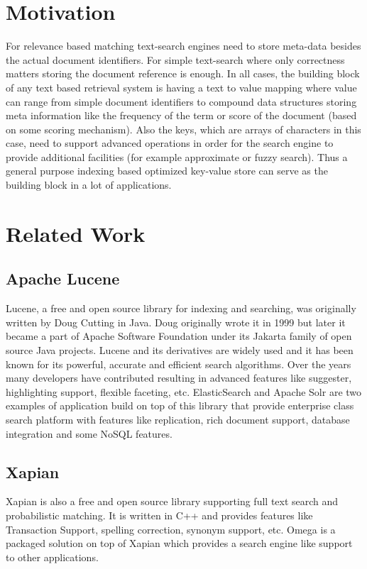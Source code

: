 \section{Motivation}
For relevance based matching text-search engines need to store meta-data besides the actual document identifiers.
For simple text-search where only correctness matters storing the document reference is enough.
In all cases, the building block of any text based retrieval system is having a text to value mapping where
value can range from simple document identifiers to compound data structures storing meta information like the frequency
of the term or score of the document (based on some scoring mechanism).
Also the keys, which are arrays of characters in this case, need to support advanced operations in order for
the search engine to provide additional facilities (for example approximate or fuzzy search).
Thus a general purpose indexing based optimized key-value store can serve as the building block in a lot of applications.

\section{Related Work}

\subsection{Apache Lucene}
Lucene, a free and open source library for indexing and searching, was originally written by Doug Cutting\cite{goetz2000lucene}
in Java. Doug originally wrote it in 1999 but later it became a part of Apache Software Foundation under its Jakarta family
of open source Java projects.
Lucene and its derivatives are widely used and it has been known for its powerful, accurate and efficient search algorithms.
Over the years many developers have contributed resulting in advanced features like suggester, highlighting support, flexible faceting, etc.
ElasticSearch and Apache Solr are two examples of application build on top of this library that provide enterprise class search
platform with features like replication, rich document support, database integration and some NoSQL features.

\subsection{Xapian}
Xapian is also a free and open source library supporting full text search and probabilistic matching.
It is written in C++ and provides features like Transaction Support, spelling correction, synonym support, etc.
Omega is a packaged solution on top of Xapian which provides a search engine like support to other applications.

